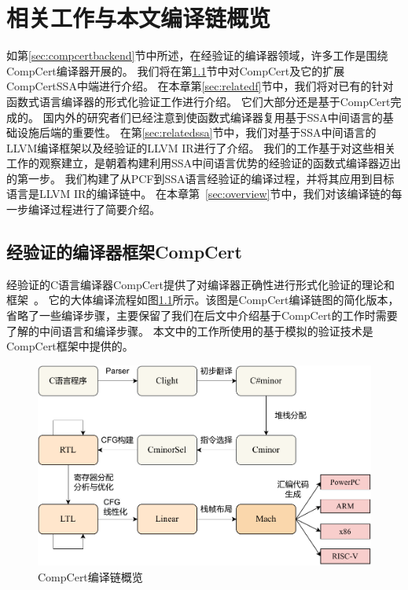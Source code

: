 
\chapter{相关工作与本文编译链概览} \label{ch:related}

如第\ref{sec:compcertbackend}节中所述，在经验证的编译器领域，许多工作是围绕CompCert编译器开展的。
我们将在第\ref{sec:relatedc}节中对CompCert及它的扩展CompCertSSA中端进行介绍。
在本章第\ref{sec:relatedf}节中，我们将对已有的针对函数式语言编译器的形式化验证工作进行介绍。
它们大部分还是基于CompCert完成的。 
国内外的研究者们已经注意到使函数式编译器复用基于SSA中间语言的基础设施后端的重要性。
在第\ref{sec:relatedssa}节中，我们对基于SSA中间语言的LLVM编译框架以及经验证的LLVM IR进行了介绍。
我们的工作基于对这些相关工作的观察建立，是朝着构建利用SSA中间语言优势的经验证的函数式编译器迈出的第一步。
我们构建了从PCF到SSA语言经验证的编译过程，并将其应用到目标语言是LLVM IR的编译链中。
在本章第~\ref{sec:overview}节中，我们对该编译链的每一步编译过程进行了简要介绍。

\section{经验证的编译器框架CompCert} \label{sec:relatedc}

经验证的C语言编译器CompCert提供了对编译器正确性进行形式化验证的理论和框架~\cite{leroy2009formally}。
它的大体编译流程如图\ref{fig:compcert}所示。该图是CompCert编译链图的简化版本，
省略了一些编译步骤，主要保留了我们在后文中介绍基于CompCert的工作时需要了解的中间语言和编译步骤。
本文中的工作所使用的基于模拟的验证技术是CompCert框架中提供的。
\begin{figure}[htbp]
    \centering
    \vspace{3ex}
    \includegraphics[width=0.8\linewidth]{figures/compcert.pdf}
    \caption{CompCert编译链概览}\label{fig:compcert}
\end{figure}

